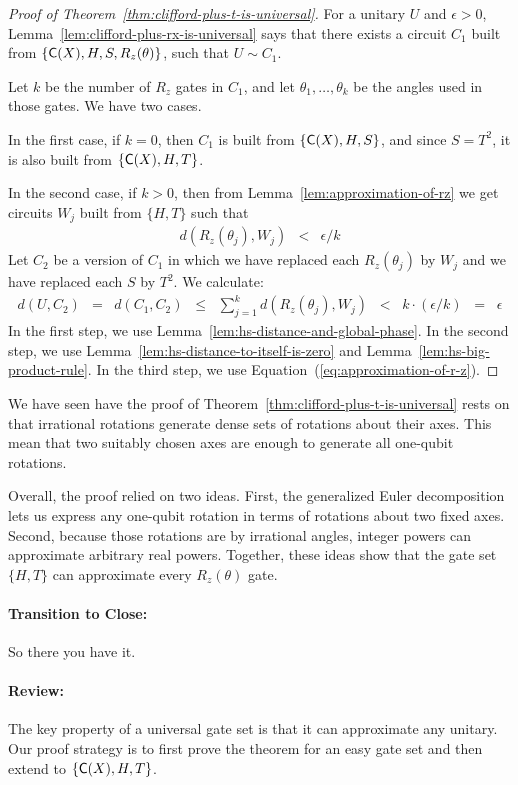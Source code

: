 \documentclass[11pt]{article}
\def\({\begin{eqnarray*}}
\def\){\end{eqnarray*}}
\def\C#1{\text{\sf C}{(#1)}}
\begin{document}
\begin{proof}[Proof of Theorem~\ref{thm:clifford-plus-t-is-universal}]
For a unitary $U$ and $\epsilon > 0$,
Lemma~\ref{lem:clifford-plus-rx-is-universal} says that
there exists a circuit $C_1$ built from $\{\C{X}, H, S, R_z(\theta)\}$,
such that $U \sim C_1$.

Let $k$ be the number of $R_z$ gates in $C_1$, and
let $\theta_1, \ldots, \theta_k$ be the angles used in those gates.
We have two cases.

In the first case,
if $k=0$, then $C_1$ is built from $\{\C{X},H,S\}$, and since
$S=T^2$, it is also built from $\{\C{X},H,T\}$.

In the second case, if $k>0$, then
from Lemma~\ref{lem:approximation-of-rz} we get circuits $W_j$ 
built from $\{H,T\}$ such that
\begin{eqnarray}
d(R_z(\theta_j),W_j) &<& \epsilon/k
\label{eq:approximation-of-r-z}
\end{eqnarray}
Let $C_2$ be a version of $C_1$ in which we have replaced
each $R_z(\theta_j)$ by $W_j$ and we have replaced each $S$ by $T^2$.
We calculate:
\(
d(U, C_2) &=& 
d(C_1, C_2) \;\;\leq\;\;
\sum_{j=1}^k d(R_z(\theta_j),W_j) \;\;<\;\;
k \cdot (\epsilon/k) \;\;=\;\; 
\epsilon
\)
In the first step, we use
Lemma~\ref{lem:hs-distance-and-global-phase}.
In the second step, we use 
Lemma~\ref{lem:hs-distance-to-itself-is-zero} and
Lemma~\ref{lem:hs-big-product-rule}.
In the third step, we use Equation~(\ref{eq:approximation-of-r-z}).
\end{proof}

We have seen have the proof of Theorem~\ref{thm:clifford-plus-t-is-universal}
rests on that irrational rotations generate dense sets of rotations about 
their axes. 
This mean that two suitably chosen axes are enough to generate 
all one-qubit rotations.

Overall, the proof relied on two ideas. 
First, the generalized Euler decomposition lets us express 
any one-qubit rotation in terms of rotations about two fixed axes. 
Second, because those rotations are by irrational angles, 
integer powers can approximate arbitrary real powers. 
Together, these ideas show that 
the gate set $\{H,T\}$ can approximate every $R_z(\theta)$ gate.

\paragraph{Transition to Close:} 
So there you have it.

\paragraph{Review:}
The key property of a universal gate set is that 
it can approximate any unitary.
Our proof strategy is to first prove the theorem for an easy gate set and then
extend to $\{\C{X}, H, T\}$.
\end{document}

